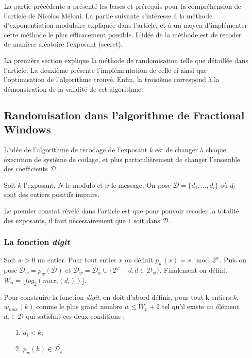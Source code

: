 \documentclass[12pt, a4paper]{memoir}
\begin{document}
La partie précédente a présenté les bases et prérequis pour la compréhension de l'article de Nicolas Méloni.
La partie suivante s'intéresse à la méthode d'exponentiation modulaire expliquée dans l'article, 
et à un moyen d'implémenter cette méthode le plus efficacement possible. 
L'idée de la méthode est de recoder de manière aléatoire l'exposant (secret).

La première section explique la méthode de randomisation telle que détaillée dans l'article.
La deuxième présente l'implémentation de celle-ci ainsi que l'optimisation de l'algorithme trouvé, 
Enfin, la troisième correspond à la démonstration de la validité de cet algorithme.

\subsection{Randomisation dans l'algorithme de Fractional Windows}

L'idée de l'algorithme de recodage de l'exposant $k$ est de changer à chaque éxecution de système de codage,
et plus particulièrement de changer l'ensemble des coefficients $\mathcal{D}$.

Soit $k$ l'exposant, $N$ le modulo et $x$ le message.
On pose $\mathcal{D} = \{d_1,\ldots,d_l\}$ où $d_l$ sont des entiers positifs impairs.

Le premier constat révélé dans l'article est que pour pouvoir recoder la totalité des exposants, il faut nécessairement
que $1$ soit dans $\mathcal{D}$.

\subsubsection{La fonction \emph{digit}}

Soit $w > 0$ un entier. Pour tout entier $x$ on définit $p_w(x) = x \mod 2^w $. 
Puis on pose $\mathcal{D}_w = p_w(\mathcal{D})$ et $\overline{\mathcal{D}_w} = \mathcal{D}_w \cup \{2^w - d: d \in \mathcal{D}_w\}$.
Finalement on définit $W_n = \lfloor log_2(max_i(d_i)) \rfloor$.

Pour construire la fonction \emph{digit}, on doit d'abord définir, pour tout k entiers $k$, $w_{max}(k)$ comme le plus grand nombre $w \leq W_n+2$ tel qu'il existe un élément $d_i \in \mathcal{D}$ qui satisfait ces deux conditions :

\begin{itemize}
 \item [1.] $d_i < k$,
 \item [2.] $p_w(k) \in \overline{\mathcal{D}_w}$
\end{itemize}
\end{document}
